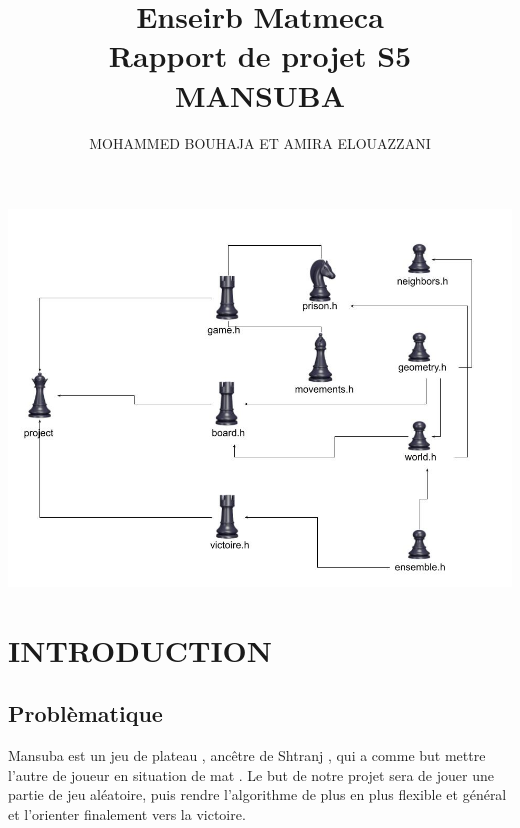 \documentclass[a4paper]{article}
\begin{document}

\title{ Enseirb Matmeca \\ Rapport de projet S5 \\ MANSUBA }
\author{MOHAMMED BOUHAJA ET AMIRA ELOUAZZANI}
\maketitle





\newpage

\tableofcontents

\newpage


\begin{center}
\includegraphics[scale=0.5]{Dessin sans titre.jpg} 

\end{center}

\section{INTRODUCTION}
\subsection{Problèmatique}
Mansuba est un jeu de plateau , ancêtre de Shtranj , qui a comme but mettre l’autre de joueur en situation de mat . 
Le but de notre projet sera de jouer une partie de jeu aléatoire, puis rendre l'algorithme de plus en plus flexible et général
et l'orienter finalement vers la victoire. 
\end{document}
